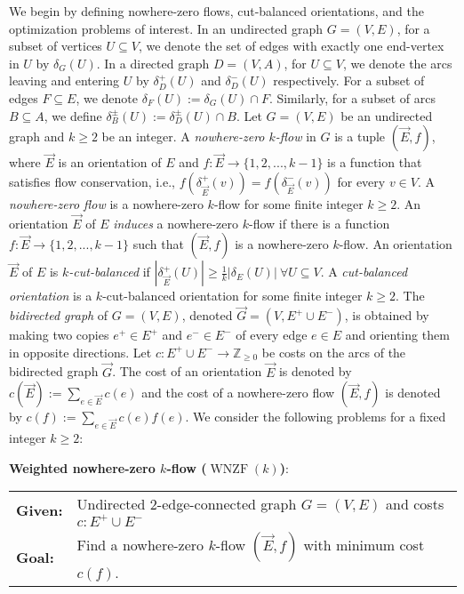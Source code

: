 \documentclass[11pt]{article}
\newcommand{\Z}{\mathbb{Z}}
\begin{document}
We begin by defining nowhere-zero flows, cut-balanced orientations, and the optimization problems of interest. 
In an undirected graph $G=(V,E)$, for a subset of vertices $U\subseteq V$, we denote the set of edges with exactly one end-vertex in $U$ by $\delta_G(U)$. In a directed graph $D=(V,A)$, for $U\subseteq V$, we denote the arcs leaving and entering $U$ by $\delta^+_{D}(U)$ and $\delta^-_{D}(U)$ respectively. For a subset of edges $F\subseteq E$, we denote $\delta_F(U):=\delta_G(U)\cap F$. Similarly, for a subset of arcs $B\subseteq A$, we define $\delta_{B}^{\pm}(U):=\delta_{D}^{\pm}(U)\cap B$.
Let $G=(V, E)$ be an undirected graph and $k\ge 2$ be an integer.
A \emph{nowhere-zero $k$-flow} in $G$ is a tuple $(\vec{E},f)$, where $\vec{E}$ is an orientation of $E$ and $f:\vec{E} \rightarrow \{1,2,...,k-1\}$ is a function that satisfies flow conservation, i.e., $f(\delta_{\vec{E}}^+(v))=f(\delta_{\vec{E}}^-(v))$ for every $v\in V$. A \emph{nowhere-zero flow} is a nowhere-zero $k$-flow for some finite integer $k\geq 2$. An orientation $\vec{E}$ of $E$ \emph{induces} a nowhere-zero $k$-flow if there is a function $f: \vec{E} \rightarrow \{1,2,...,k-1\}$ such that $(\vec{E}, f)$ is a nowhere-zero $k$-flow. 
An orientation $\vec{E}$ of $E$ is \emph{$k$-cut-balanced} if $|\delta_{\vec{E}}^+(U)|\geq \frac{1}{k}|\delta_{E}(U)| \ \forall U\subseteq V$. 
A \emph{cut-balanced orientation} is a $k$-cut-balanced orientation for some finite integer $k\ge 2$. 
The \emph{bidirected graph} of $G=(V,E)$, denoted $\vec{G}=(V,E^+\cup E^-)$, is obtained by making two copies $e^+\in E^+$ and $e^-\in E^-$ of every edge $e\in E$ and orienting them in opposite directions. Let  $c:E^+\cup E^-\rightarrow \Z_{\ge 0}$ be costs on the arcs of the bidirected graph $\vec{G}$. The cost of an orientation $\vec{E}$ is denoted by $c(\vec{E}):=\sum_{e\in \vec{E}}c(e)$ and the cost of a nowhere-zero flow $(\vec{E}, f)$ is denoted by $c(f):=\sum_{e\in \vec{E}}c(e)f(e)$. 
We consider the following problems for a fixed integer $k\ge 2$:

\begin{mdframed}
\textbf{Weighted nowhere-zero $k$-flow ($\operatorname{WNZF}(k)$)}:  \\
\begin{tabular}{ l l }
\textbf{Given:}& Undirected $2$-edge-connected graph $G=(V, E)$ and costs $c: E^+\cup E^-$ \\
\textbf{Goal:}& Find a nowhere-zero $k$-flow $(\vec{E},f)$ with minimum cost $c(f)$.
\end{tabular}
\end{mdframed}
\end{document}
